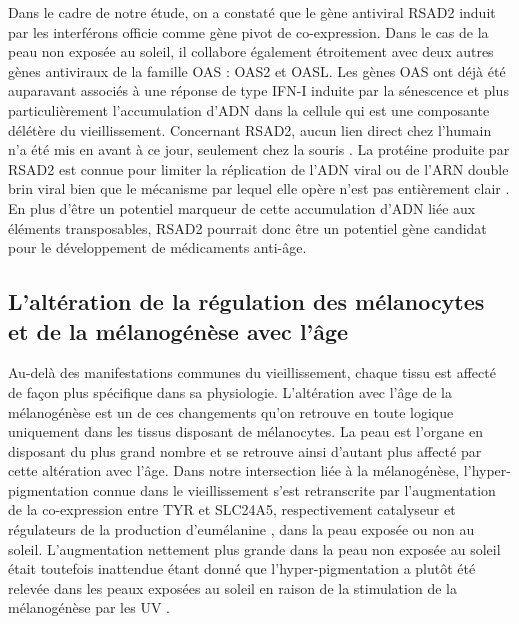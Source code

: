 Dans le cadre de notre étude, on a constaté que le gène antiviral RSAD2 induit par les interférons officie comme gène pivot de co-expression. Dans le cas de la peau non exposée au soleil, il collabore également étroitement avec deux autres gènes antiviraux de la famille OAS : OAS2 et OASL. Les gènes OAS ont déjà été auparavant associés à une réponse de type IFN-I induite par la sénescence et plus particulièrement l'accumulation d'ADN dans la cellule  qui est une composante délétère du vieillissement. Concernant RSAD2, aucun lien direct chez l'humain n'a été mis en avant à ce jour, seulement chez la souris . La protéine produite par RSAD2 est connue pour limiter la réplication de l'ADN viral ou de l'ARN double brin viral bien que le mécanisme par lequel elle opère n'est pas entièrement clair . En plus d'être un potentiel marqueur de cette accumulation d'ADN liée aux éléments transposables, RSAD2 pourrait donc être un potentiel gène candidat pour le développement de médicaments anti-âge.


\subsection{L'altération de la régulation des mélanocytes et de la mélanogénèse avec l'âge}

Au-delà des manifestations communes du vieillissement, chaque tissu est affecté de façon plus spécifique dans sa physiologie. L'altération avec l'âge de la mélanogénèse est un de ces changements qu'on retrouve en toute logique uniquement dans les tissus disposant de mélanocytes. La peau est l'organe en disposant du plus grand nombre et se retrouve ainsi d'autant plus affecté par cette altération avec l'âge. Dans notre intersection liée à la mélanogénèse, l'hyper-pigmentation connue dans le vieillissement  s'est retranscrite par l'augmentation de la co-expression entre TYR et SLC24A5, respectivement catalyseur et régulateurs de la production d'eumélanine , dans la peau exposée ou non au soleil. L'augmentation nettement plus grande dans la peau non exposée au soleil était toutefois inattendue étant donné que l'hyper-pigmentation a plutôt été relevée dans les peaux exposées au soleil en raison de la stimulation de la mélanogénèse par les UV . 

